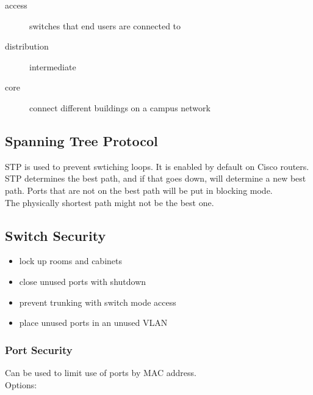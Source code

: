 \begin{description}

\item[access]
switches that end users are connected to

\item[distribution]
intermediate

\item[core]
connect different buildings on a campus network

\end{description}

\subsection{Spanning Tree Protocol}

STP is used to prevent swtiching loops. It is enabled by default on Cisco
routers.\\

STP determines the best path, and if that goes down, will determine a new best
path. Ports that are not on the best path will be put in blocking mode.\\

The physically shortest path might not be the best one.

\subsection{Switch Security}

\begin{itemize}

\item lock up rooms and cabinets
\item close unused ports with shutdown
\item prevent trunking with switch mode access
\item place unused ports in an unused VLAN

\end{itemize}

\subsubsection{Port Security}

Can be used to limit use of ports by MAC address.\\

Options:


